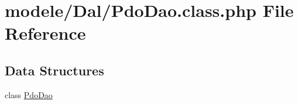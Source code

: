 \hypertarget{_pdo_dao_8class_8php}{}\section{modele/\+Dal/\+Pdo\+Dao.class.\+php File Reference}
\label{_pdo_dao_8class_8php}
\subsection*{Data Structures}
\begin{DoxyCompactItemize}
\item 
class \hyperlink{class_pdo_dao}{Pdo\+Dao}
\end{DoxyCompactItemize}
